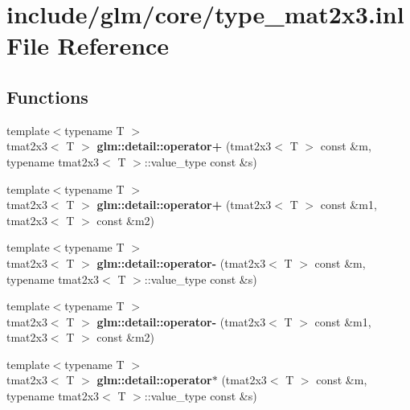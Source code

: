 \hypertarget{type__mat2x3_8inl}{\section{include/glm/core/type\-\_\-mat2x3.inl \-File \-Reference}
\label{type__mat2x3_8inl}
}
\subsection*{\-Functions}
\begin{DoxyCompactItemize}
\item 
\hypertarget{namespaceglm_1_1detail_abf7e7eb0ce6462cde7aa0a76e2da66cf}{{\footnotesize template$<$typename T $>$ }\\tmat2x3$<$ \-T $>$ {\bfseries glm\-::detail\-::operator+} (tmat2x3$<$ \-T $>$ const \&m, typename tmat2x3$<$ \-T $>$\-::value\-\_\-type const \&s)}\label{namespaceglm_1_1detail_abf7e7eb0ce6462cde7aa0a76e2da66cf}

\item 
\hypertarget{namespaceglm_1_1detail_a035a2fb5e973f9650888c10c93c2617a}{{\footnotesize template$<$typename T $>$ }\\tmat2x3$<$ \-T $>$ {\bfseries glm\-::detail\-::operator+} (tmat2x3$<$ \-T $>$ const \&m1, tmat2x3$<$ \-T $>$ const \&m2)}\label{namespaceglm_1_1detail_a035a2fb5e973f9650888c10c93c2617a}

\item 
\hypertarget{namespaceglm_1_1detail_afd2db126e63c1d90951a090c2e160b7f}{{\footnotesize template$<$typename T $>$ }\\tmat2x3$<$ \-T $>$ {\bfseries glm\-::detail\-::operator-\/} (tmat2x3$<$ \-T $>$ const \&m, typename tmat2x3$<$ \-T $>$\-::value\-\_\-type const \&s)}\label{namespaceglm_1_1detail_afd2db126e63c1d90951a090c2e160b7f}

\item 
\hypertarget{namespaceglm_1_1detail_a3f7dd2b3b537266dd9453a0761a228ae}{{\footnotesize template$<$typename T $>$ }\\tmat2x3$<$ \-T $>$ {\bfseries glm\-::detail\-::operator-\/} (tmat2x3$<$ \-T $>$ const \&m1, tmat2x3$<$ \-T $>$ const \&m2)}\label{namespaceglm_1_1detail_a3f7dd2b3b537266dd9453a0761a228ae}

\item 
\hypertarget{namespaceglm_1_1detail_a24e0653c35e5a18fbd8a3397ee4b71cc}{{\footnotesize template$<$typename T $>$ }\\tmat2x3$<$ \-T $>$ {\bfseries glm\-::detail\-::operator$\ast$} (tmat2x3$<$ \-T $>$ const \&m, typename tmat2x3$<$ \-T $>$\-::value\-\_\-type const \&s)}\label{namespaceglm_1_1detail_a24e0653c35e5a18fbd8a3397ee4b71cc}


\end{DoxyCompactItemize}
